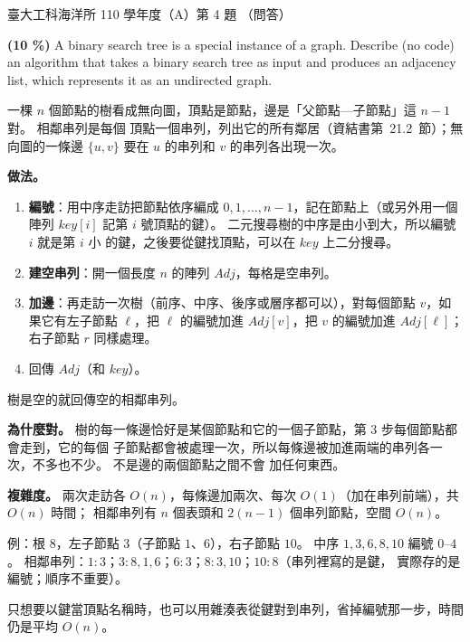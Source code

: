 \begin{pastexam}[label={px:ntu-110-esoe-ds-04}]{臺大工科海洋所 110 學年度（A）第 4 題}
（問答）

\textbf{(10 \%)} A binary search tree is a special instance of a graph. Describe (no code) an
algorithm that takes a binary search tree as input and produces an adjacency list, which represents
it as an undirected graph.
\end{pastexam}

\begin{pastsoln}
一棵 $n$ 個節點的樹看成無向圖，頂點是節點，邊是「父節點—子節點」這 $n - 1$ 對。 相鄰串列是每個
頂點一個串列，列出它的所有鄰居（資結書第~21.2~節）；無向圖的一條邊 $\{u, v\}$ 要在 $u$ 的串列和
$v$ 的串列各出現一次。

\textbf{做法。}
\begin{enumerate}
\item \textbf{編號}：用中序走訪把節點依序編成 $0, 1, \ldots, n - 1$，記在節點上（或另外用一個陣列
$\mathit{key}[i]$ 記第 $i$ 號頂點的鍵）。 二元搜尋樹的中序是由小到大，所以編號 $i$ 就是第 $i$ 小
的鍵，之後要從鍵找頂點，可以在 $\mathit{key}$ 上二分搜尋。
\item \textbf{建空串列}：開一個長度 $n$ 的陣列 $\mathit{Adj}$，每格是空串列。
\item \textbf{加邊}：再走訪一次樹（前序、中序、後序或層序都可以），對每個節點 $v$，如果它有左子節點
$\ell$，把 $\ell$ 的編號加進 $\mathit{Adj}[v]$，把 $v$ 的編號加進 $\mathit{Adj}[\ell]$；右子節點 $r$
同樣處理。
\item 回傳 $\mathit{Adj}$（和 $\mathit{key}$）。
\end{enumerate}
樹是空的就回傳空的相鄰串列。

\textbf{為什麼對。} 樹的每一條邊恰好是某個節點和它的一個子節點，第 3 步每個節點都會走到，它的每個
子節點都會被處理一次，所以每條邊被加進兩端的串列各一次，不多也不少。 不是邊的兩個節點之間不會
加任何東西。

\textbf{複雜度。} 兩次走訪各 $O(n)$，每條邊加兩次、每次 $O(1)$（加在串列前端），共 $O(n)$ 時間；
相鄰串列有 $n$ 個表頭和 $2(n - 1)$ 個串列節點，空間 $O(n)$。

例：根 $8$，左子節點 $3$（子節點 $1$、$6$），右子節點 $10$。 中序 $1, 3, 6, 8, 10$ 編號 $0$--$4$。
相鄰串列：$1\colon 3$；$3\colon 8, 1, 6$；$6\colon 3$；$8\colon 3, 10$；$10\colon 8$（串列裡寫的是鍵，
實際存的是編號；順序不重要）。

只想要以鍵當頂點名稱時，也可以用雜湊表從鍵對到串列，省掉編號那一步，時間仍是平均 $O(n)$。
\end{pastsoln}
